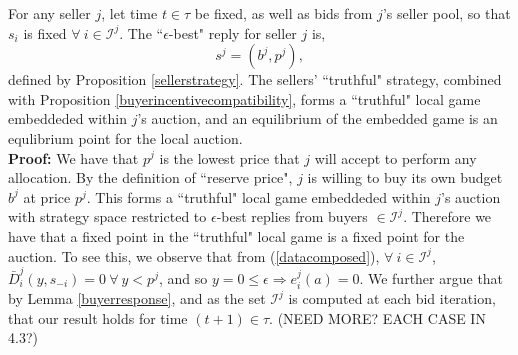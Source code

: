 \documentclass[12pt]{article}
\theoremstyle{definition}
\newcommand{\mcI}{\mathcal{I}}
\begin{document}
\begin{multicols}{2}
{
For any seller $j$, let time $t \in \tau$ be fixed, as well as bids from $j$'s
seller pool, so that $s_i$ is fixed $\forall \ i \in\mcI^j$. The
``$\epsilon$-best" reply for seller $j$ is,
$$
    s^j = (b^j, p^j),
$$
defined by Proposition \ref{sellerstrategy}.
The sellers' ``truthful" strategy, combined with Proposition
\ref{buyerincentivecompatibility}, forms a
``truthful" local game embeddeded within $j$'s auction, and an equilibrium of
the embedded game is an equlibrium point for the local auction. 
}\\
\textbf{Proof:}
We have that $p^j$ is the lowest price that $j$
will accept to perform any allocation. By the definition of ``reserve
price", $j$ is willing to buy its own budget $b^j$ at price $p^j$. This forms a
``truthful" local game embeddeded within $j$'s auction with strategy space
restricted to $\epsilon$-best replies from buyers $\in \mcI^j$. Therefore we have that a
fixed point in the ``truthful" local game is a fixed point for the auction.
To see this, we observe that from (\ref{datacomposed}), $\forall \ i \in \mcI^j$, $\bar{D}_i^j(y, s_{-i}) =
0 \ \forall \ y < p^j$, and so $y=0 \le \epsilon \Rightarrow e_i^j(a) = 0$. We
further argue that by Lemma \ref{buyerresponse}, and as the set $\mcI^j$ is
computed at each bid iteration, that our result holds for time $(t+1) \in \tau$.
(NEED MORE? EACH CASE IN 4.3?)

{
}


\end{multicols}
\end{document}
